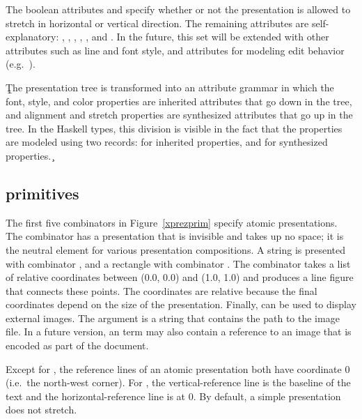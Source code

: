 \documentclass[12pt]{article}
\begin{document}
The boolean attributes  and  specify whether or not the presentation is allowed to stretch in horizontal or vertical direction. The remaining attributes are self-explanatory: , , , , , and . In the future, this set will be extended with other attributes such as line and font style, and attributes for modeling edit behavior (e.g.\ ).
 
\b\c
The presentation tree is transformed into an attribute grammar in which the font, style, and color properties are inherited attributes that go down in the tree, and alignment and stretch properties are synthesized attributes that go up in the tree. In the Haskell types, this division is visible in the fact that the properties are modeled using two records:  for inherited properties, and  for synthesized properties.
\e\c

%																
\subsection{{\Xprez} primitives} \label{sect:primitives}

The first five combinators in Figure~\ref{xprezprim} specify atomic presentations. The  combinator has a presentation that is invisible and takes up no space; it is the neutral element for various presentation compositions. A string is presented with combinator , and a rectangle with combinator . The  combinator takes a list of relative coordinates between (0.0, 0.0) and (1.0, 1.0) and produces a line figure that connects these points. The coordinates are relative because the final coordinates depend on the size of the  presentation. Finally,  can be used to display external images. The argument is a string that contains the path to the image file. In a future version, an  term may also contain a reference to an image that is encoded as part of the document.

Except for , the reference lines of an atomic presentation both have coordinate 0 (i.e.\ the north-west corner). For ,  the vertical-reference line is the baseline of the text and the horizontal-reference line is at 0. By default, a  simple presentation does not stretch.
\end{document}
